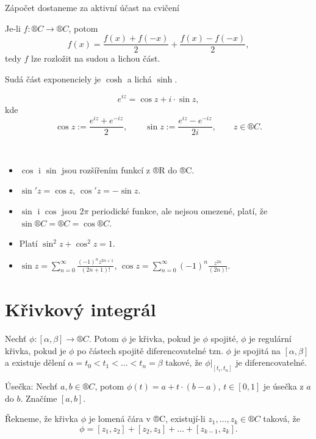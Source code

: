 \documentclass[12pt]{article}					%
\begin{document}
\begin{poznamka}[Zápočet]
	Zápočet dostaneme za aktivní účast na cvičení
\end{poznamka}


\begin{poznamka}
	Je-li $f: ®C \rightarrow ®C$, potom
	$$ f(x) = \frac{f(x) + f(-x)}{2} + \frac{f(x) - f(-x)}{2}, $$
	tedy $f$ lze rozložit na sudou a lichou část.

	Sudá část exponenciely je $\cosh$ a lichá $\sinh$.
\end{poznamka}

\begin{definice}
	$$ e^{iz} = \cos z + i·\sin z, $$
	kde
	$$ \cos z := \frac{e^{iz} + e^{-iz}}{2}, \qquad \sin z := \frac{e^{iz} - e^{-iz}}{2i}, \qquad z \in ®C. $$
\end{definice}

\begin{tvrzeni}[Vlastnosti]
	\ 
	\begin{itemize}
		\item $\cos$ i $\sin$ jsou rozšířením funkcí z ®R do ®C.
		\item $\sin' z = \cos z$, $\cos' z = -\sin z$.
		\item $\sin$ i $\cos$ jsou $2\pi$ periodické funkce, ale nejsou omezené, platí, že $\sin ®C = ®C = \cos ®C$.
		\item Platí $\sin^2 z + \cos^2 z = 1$.
		\item $\sin z = \sum_{n=0}^{∞} \frac{(-1)^n z^{2n + 1}}{(2n + 1)!}$, $\cos z = \sum_{n=0}^∞ (-1)^n \frac{z^{2n}}{(2n)!}$.
	\end{itemize}
\end{tvrzeni}

\section{Křivkový integrál}
\begin{definice}[Značení]
	Nechť $\phi:[\alpha, \beta] \rightarrow ®C$. Potom $\phi$ je křivka, pokud je $\phi$ spojité, $\phi$ je regulární křivka, pokud je $\phi$ po částech spojitě diferencovatelné tzn. $\phi$ je spojitá na $[\alpha, \beta]$ a existuje dělení $\alpha = t_0 < t_1 < … < t_n = \beta$ takové, že $\phi|_{[t_i, t_n]}$ je diferencovatelné.

	Úsečka: Nechť $a, b \in ®C$, potom $\phi(t) = a + t·(b - a)$, $t \in [0, 1]$ je úsečka z $a$ do $b$. Značíme $[a, b]$.

	Řekneme, že křivka $\phi$ je lomená čára v ®C, existují-li $z_1, …, z_k \in ®C$ taková, že
	$$ \phi = [z_1, z_2] + [z_2, z_3] + … + [z_{k-1}, z_k]. $$
\end{definice}
\end{document}
